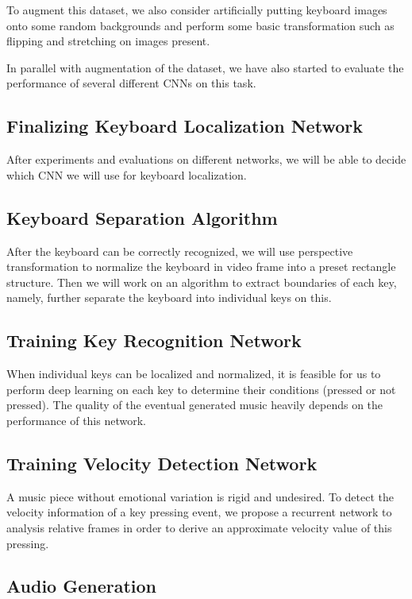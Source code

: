\documentclass[10pt,twocolumn,letterpaper]{article}
\begin{document}
To augment this dataset, we also consider artificially putting keyboard images onto some random backgrounds and perform some basic transformation such as flipping and stretching on images present.

In parallel with augmentation of the dataset, we have also started to evaluate the performance of several different CNNs on this task.

\subsection{Finalizing Keyboard Localization Network}

After experiments and evaluations on different networks, we will be able to decide which CNN we will use for keyboard localization.

\subsection{Keyboard Separation Algorithm}

After the keyboard can be correctly recognized, we will use perspective transformation to normalize the keyboard in video frame into a preset rectangle structure. Then we will work on an algorithm to extract boundaries of each key, namely, further separate the keyboard into individual keys on this.

\subsection{Training Key Recognition Network}

When individual keys can be localized and normalized, it is feasible for us to perform deep learning on each key to determine their conditions (pressed or not pressed). The quality of the eventual generated music heavily depends on the performance of this network.

\subsection{Training Velocity Detection Network}

A music piece without emotional variation is rigid and undesired. To detect the velocity information of a key pressing event, we propose a recurrent network to analysis relative frames in order to derive an approximate velocity value of this pressing.

\subsection{Audio Generation}
\end{document}
